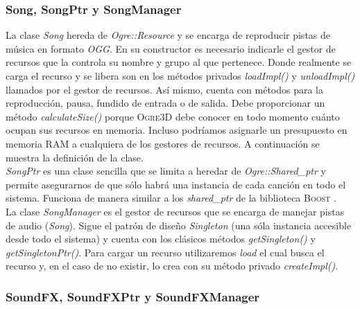 
\subsubsection{Song, SongPtr y SongManager}

La clase \textit{Song} hereda de \textit{Ogre::Resource} y se encarga de
reproducir pistas de música en formato \textit{OGG}. En su constructor es
necesario indicarle el gestor de recursos que la controla su nombre y grupo
al que pertenece. Donde realmente se carga el recurso y se libera son en
los métodos privados \textit{loadImpl()} y \textit{unloadImpl()} llamados
por el gestor de recursos. Así mismo, cuenta con métodos para la reproducción,
pausa, fundido de entrada o de salida. Debe proporcionar un método
\textit{calculateSize()} porque \textsc{Ogre3D} debe conocer en todo momento
cuánto ocupan sus recursos en memoria. Incluso podríamos asignarle un presupuesto
en memoria RAM a cualquiera de los gestores de recursos. A continuación
se muestra la definición de la clase.\\



\textit{SongPtr} es una clase sencilla que se limita a heredar de
\textit{Ogre::Shared\_ptr} y permite asegurarnos de que sólo habrá una instancia
de cada canción en todo el sistema. Funciona de manera similar a los
\textit{shared\_ptr} de la biblioteca \textsc{Boost} \cite{website:boost}.\\



La clase \textit{SongManager} es el gestor de recursos que se encarga de manejar
pistas de audio (\textit{Song}). Sigue el patrón de diseño \textit{Singleton}
(una sóla instancia accesible desde todo el sistema)
\cite{gamm77} y cuenta con los clásicos métodos \textit{getSingleton()} y
\textit{getSingletonPtr()}. Para cargar un recurso utilizaremos \textit{load}
el cual busca el recurso y, en el caso de no existir, lo crea con su método
privado \textit{createImpl()}.



\subsubsection{SoundFX, SoundFXPtr y SoundFXManager}

